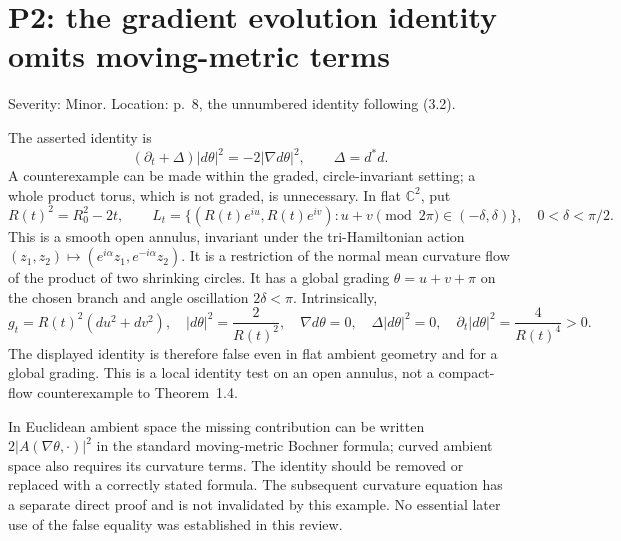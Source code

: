 \documentclass[10pt]{article}
\begin{document}
\section*{P2: the gradient evolution identity omits moving-metric terms}
Severity: Minor. Location: p. 8, the unnumbered identity following (3.2).\par
The asserted identity is \[(\partial_t+\Delta)|d\theta|^2=-2|\nabla d\theta|^2,
 \qquad \Delta=d^*d.\] A counterexample can be made within the graded, circle-invariant setting; a whole product torus, which is not graded, is unnecessary. In flat \(\mathbb C^2\), put \[R(t)^2=R_0^2-2t,\qquad
 L_t=\{(R(t)e^{iu},R(t)e^{iv}):u+v\pmod{2\pi}\in(-\delta,\delta)\},
 \quad 0<\delta<\pi/2 .\] This is a smooth open annulus, invariant under the tri-Hamiltonian action \((z_1,z_2)\mapsto(e^{i\alpha}z_1,e^{-i\alpha}z_2)\). It is a restriction of the normal mean curvature flow of the product of two shrinking circles. It has a global grading \(\theta=u+v+\pi\) on the chosen branch and angle oscillation \(2\delta<\pi\). Intrinsically, \[g_t=R(t)^2(du^2+dv^2),\quad
 |d\theta|^2=\frac2{R(t)^2},\quad
 \nabla d\theta=0,\quad
 \Delta|d\theta|^2=0,\quad
 \partial_t|d\theta|^2=\frac4{R(t)^4}>0.\] The displayed identity is therefore false even in flat ambient geometry and for a global grading. This is a local identity test on an open annulus, not a compact-flow counterexample to Theorem 1.4.\par
In Euclidean ambient space the missing contribution can be written \(2|A(\nabla\theta,\cdot)|^2\) in the standard moving-metric Bochner formula; curved ambient space also requires its curvature terms. The identity should be removed or replaced with a correctly stated formula. The subsequent curvature equation has a separate direct proof and is not invalidated by this example. No essential later use of the false equality was established in this review.\par
\end{document}
